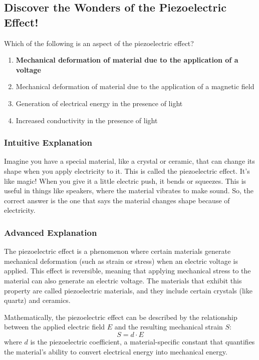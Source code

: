 \subsection{Discover the Wonders of the Piezoelectric Effect!}

\begin{tcolorbox}[colback=gray!10!white,colframe=black!75!black,title=E6D03] Which of the following is an aspect of the piezoelectric effect?
    \begin{enumerate}[label=\Alph*.]
        \item \textbf{Mechanical deformation of material due to the application of a voltage}
        \item Mechanical deformation of material due to the application of a magnetic field
        \item Generation of electrical energy in the presence of light
        \item Increased conductivity in the presence of light
    \end{enumerate}
\end{tcolorbox}

\subsubsection{Intuitive Explanation}
Imagine you have a special material, like a crystal or ceramic, that can change its shape when you apply electricity to it. This is called the piezoelectric effect. It’s like magic! When you give it a little electric push, it bends or squeezes. This is useful in things like speakers, where the material vibrates to make sound. So, the correct answer is the one that says the material changes shape because of electricity.

\subsubsection{Advanced Explanation}
The piezoelectric effect is a phenomenon where certain materials generate mechanical deformation (such as strain or stress) when an electric voltage is applied. This effect is reversible, meaning that applying mechanical stress to the material can also generate an electric voltage. The materials that exhibit this property are called piezoelectric materials, and they include certain crystals (like quartz) and ceramics.

Mathematically, the piezoelectric effect can be described by the relationship between the applied electric field \( E \) and the resulting mechanical strain \( S \):
\[
S = d \cdot E
\]
where \( d \) is the piezoelectric coefficient, a material-specific constant that quantifies the material's ability to convert electrical energy into mechanical energy.

